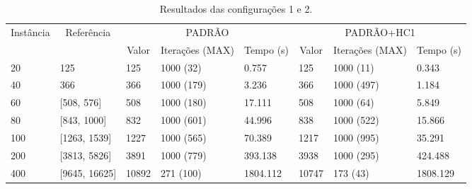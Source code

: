 \documentclass{MO824}
\begin{document}
\vspace{-0.15cm}

{\footnotesize }

\begin{table}[htp!]
\begin{adjustwidth}{-2cm}{}
\centering
\caption{Resultados das configurações 1 e 2.}
\label{table:conf12}
\begin{tabular}{|l|l|l|l|l|l|l|l|}
\hline
\multicolumn{1}{|c|}{\multirow{2}{*}{Instância}} & \multicolumn{1}{|c|}{\multirow{2}{*}{Referência}} & \multicolumn{3}{c|}{PADRÃO}  & \multicolumn{3}{c|}{PADRÃO+HC1}                                                                \\ \cline{3-8} 
\multicolumn{1}{|c|}{} & \multicolumn{1}{|c|}{}                           & \multicolumn{1}{c|}{Valor} & \multicolumn{1}{c|}{Iterações (MAX)} & \multicolumn{1}{c|}{Tempo (s)} & \multicolumn{1}{c|}{Valor} & \multicolumn{1}{c|}{Iterações (MAX)} & \multicolumn{1}{c|}{Tempo (s)} \\ \hline
20              &  125                               & 125                        & 1000 (32)                            & 0.757                      & 125                        & 1000 (11)                            & 0.343                      \\ \hline
40             & 366                                  & 366                        & 1000 (179)                           & 3.236                      & 366                        & 1000 (497)                           & 1.184                      \\ \hline
60          & [508, 576]                                     & 508                        & 1000 (180)                           & 17.111                     & 508                        & 1000 (64)                            & 5.849                      \\ \hline
80          & [843, 1000]                                     & 832                        & 1000 (601)                           & 44.996                     & 838                        & 1000 (522)                           & 15.866                     \\ \hline
100         & [1263, 1539]                                     & 1227                       & 1000 (565)                           & 70.389                     & 1217                       & 1000 (995)                           & 35.291                     \\ \hline
200         & [3813, 5826]                                    & 3891                       & 1000 (779)                           & 393.138                    & 3938                       & 1000 (295)                           & 424.488                    \\ \hline
400         & [9645, 16625]                                  & 10892                      & 271 (100)                            & 1804.112                   & 10747                      & 173 (43)                             & 1808.129                   \\ \hline
\end{tabular}
\end{adjustwidth}
\end{table}
\end{document}
